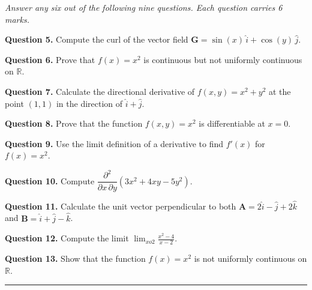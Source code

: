 \documentclass[11pt,a4paper]{article}
\begin{document}
\medskip


\noindent   \textit{Answer any six out of the following nine questions. Each question carries 6 marks.}

\bigskip




\noindent   \textbf{Question 5.} Compute the curl of the vector field $\mathbf{G} = \sin(x)\,\hat{i} + \cos(y)\,\hat{j}$.

\bigskip




\noindent   \textbf{Question 6.} Prove that $f(x) = x^2$ is continuous but not uniformly continuous on $\mathbb{R}$.

\bigskip




\noindent   \textbf{Question 7.} Calculate the directional derivative of $f(x,y) = x^2 + y^2$ at the point $(1,1)$ in the direction of $\hat{i} + \hat{j}$.

\bigskip




\noindent   \textbf{Question 8.} Prove that the function $f(x,y) = x^2$ is differentiable at $x = 0$.

\bigskip




\noindent   \textbf{Question 9.} Use the limit definition of a derivative to find $f'(x)$ for $f(x) = x^2$.

\bigskip




\noindent   \textbf{Question 10.} Compute $\dfrac{\partial^2}{\partial x\,\partial y}(3x^2 + 4xy - 5y^2)$.

\bigskip




\noindent   \textbf{Question 11.} Calculate the unit vector perpendicular to both $\mathbf{A} = 2\hat{i} - \hat{j} + 2\hat{k}$ and $\mathbf{B} = \hat{i} + \hat{j} - \hat{k}$.

\bigskip




\noindent   \textbf{Question 12.} Compute the limit $\displaystyle\lim_{x  o 2} \frac{x^2 - 4}{x - 2}$.

\bigskip




\noindent   \textbf{Question 13.} Show that the function $f(x) = x^2$ is not uniformly continuous on $\mathbb{R}$.

\bigskip

\rule{\linewidth}{0.4pt}
\end{document}
